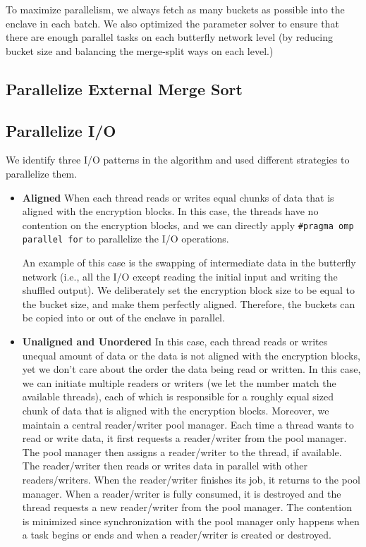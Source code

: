 \documentclass{article}
\begin{document}
To maximize parallelism, we always fetch as many buckets as possible into the enclave in each batch. We also optimized the parameter solver to ensure that there are enough parallel tasks on each butterfly network level (by reducing bucket size and balancing the merge-split ways on each level.)

\subsection{Parallelize External Merge Sort}
\subsection{Parallelize I/O}
We identify three I/O patterns in the algorithm and used different strategies to parallelize them.
\begin{itemize}
    \item {\bf Aligned}
    When each thread reads or writes equal chunks of data that is aligned with the encryption blocks. In this case, the threads have no contention on the encryption blocks, and we can directly apply {\tt \#pragma omp parallel for} to parallelize the I/O operations.

    An example of this case is the swapping of intermediate data in the butterfly network (i.e., all the I/O except reading the initial input and writing the shuffled output). We deliberately set the encryption block size to be equal to the bucket size, and make them perfectly aligned. Therefore, the buckets can be copied into or out of the enclave in parallel.
    \item {\bf Unaligned and Unordered}
    In this case, each thread reads or writes unequal amount of data or the data is not aligned with the encryption blocks, yet we don't care about the order the data being read or written. In this case, we can initiate multiple readers or writers (we let the number match the available threads), each of which is responsible for a roughly equal sized chunk of data that is aligned with the encryption blocks. Moreover, we maintain a central reader/writer pool manager. Each time a thread wants to read or write data, it first requests a reader/writer from the pool manager. The pool manager then assigns a reader/writer to the thread, if available. The reader/writer then reads or writes data in parallel with other readers/writers. When the reader/writer finishes its job, it returns to the pool manager. When a reader/writer is fully consumed, it is destroyed and the thread requests a new reader/writer from the pool manager. The contention is minimized since synchronization with the pool manager only happens when a task begins or ends and when a reader/writer is created or destroyed.


\end{itemize}
\end{document}
